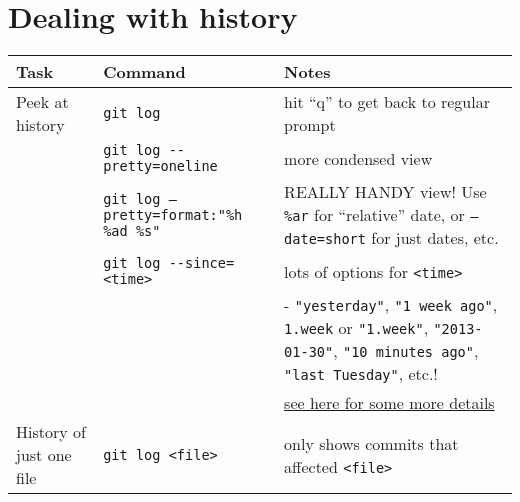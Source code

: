 \documentclass[]{article}
\begin{document}
\section*{Dealing with history}
\label{sec-3}


\begin{center}
\begin{tabular}{llp{2.5in}}
 Task                          &  Command                                          &  Notes                                                                                                                                                                  \\
\hline
 Peek at history               &  \texttt{git log}                                 &  hit ``q'' to get back to regular prompt                                                                                                                                \\
                               &  \texttt{git log -{}-pretty=oneline}              &  more condensed view                                                                                                                                                    \\
                               &  \texttt{git log --pretty=format:"\%h \%ad \%s"}  &  REALLY HANDY view! Use \texttt{\%ar} for ``relative'' date, or \texttt{--date=short} for just dates, etc.                                                              \\
                               &  \texttt{git log -{}-since=<time>}                &  lots of options for \texttt{<time>}                                                                                                                                    \\
                               &                                                   &  - \texttt{"yesterday"}, \texttt{"1 week ago"}, \texttt{1.week} or \texttt{"1.week"}, \texttt{"2013-01-30"}, \texttt{"10 minutes ago"}, \texttt{"last Tuesday"}, etc.!  \\
                               &                                                   &  \href{http://www.alexpeattie.com/blog/working-with-dates-in-git/}{see here for some more details}                                                                      \\
 History of just one file      &  \texttt{git log <file>}                          &  only shows commits that affected \texttt{<file>}                                                                                                                       \\

\end{tabular}
\end{center}
\end{document}
